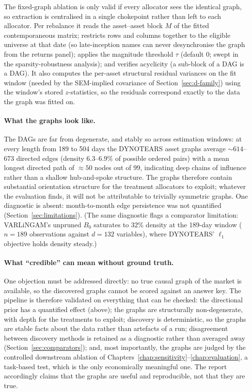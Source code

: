 The fixed-graph ablation is only valid if every allocator sees the
identical graph, so extraction is centralised in a single
chokepoint rather than left to each allocator. Per rebalance it reads the
asset--asset block $M$ of the fitted contemporaneous matrix; restricts rows
and columns together to the eligible universe at that date (so
late-inception names can never desynchronise the graph from the returns
panel); applies the magnitude threshold $\tau$ (default $0$; swept in the
sparsity-robustness analysis); and verifies acyclicity (a sub-block of a DAG
is a DAG). It also computes the per-asset structural residual variances on
the fit window (needed by the SEM-implied covariance of
Section~\ref{sec:d-family}) using the window's stored $z$-statistics, so
the residuals correspond exactly to the data the graph was fitted on.

\paragraph{What the graphs look like.} The DAGs are far from degenerate,
and stably so across estimation windows: at every length from 189 to 504
days the DYNOTEARS asset graphs average ${\sim}614$--$673$ directed edges
(density $6.3$--$6.9\%$ of possible ordered pairs) with a mean longest
directed
path of ${\approx}50$ nodes out of 99, indicating deep chains of influence
rather than a shallow hub-and-spoke structure. The graphs therefore contain
substantial orientation structure for the treatment allocators to exploit;
whatever the evaluation finds, it will not be attributable to trivially
symmetric graphs. One diagnostic is absent: month-to-month edge
persistence was not quantified
(Section~\ref{sec:limitations}). (The
same diagnostic flags a comparator limitation: VARLiNGAM's unpruned $B_0$
saturates to $32\%$ density at the 189-day window ($n=189$ observations
against $d=132$ variables), where DYNOTEARS' $\ell_1$ objective holds
density steady.)

\paragraph{What ``credible'' can mean without ground truth.} One objection
must be addressed directly: no true causal graph of the market is
available, so the
discovered graphs cannot be scored against an answer key. The pipeline is
therefore validated on everything that can be checked: the
directional prior has a quantified effect (above); the graphs are
structurally non-degenerate, with depth for the treatments to
exploit; discovery is deterministic, so the graphs are stable
facts about the data rather than artefacts of a run; disagreement between
discovery methods is retained as a diagnostic rather than averaged away
(Section~\ref{sec:comparators}); and, most importantly, the graphs are
judged by the controlled downstream ablation of
Chapters~\ref{chap:sensitivity}--\ref{chap:evaluation}, a task-based
test, which is the only economically meaningful one. The report accordingly
claims that the graphs are useful and reproducible, not that they
are true.

